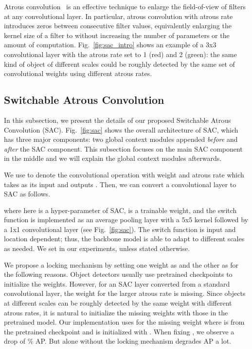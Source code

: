 \documentclass[final]{cvpr}
\begin{document}
Atrous convolution~\cite{holschneider1989real,papandreou2014untangling,chen2014semantic} is an effective technique to enlarge
the field-of-view of filters at any convolutional layer. In particular, atrous convolution with atrous rate  introduces  zeros between consecutive filter values, equivalently enlarging the kernel size of a  filter
to  without increasing the number of parameters or the amount of computation.
Fig.~\ref{fig:sac_intro} shows an example of a 3x3 convolutional layer with the atrous rate set to 1 (red) and 2 (green):
the same kind of object of different scales could be roughly detected by the same set of convolutional weights using different atrous rates.

\subsection{Switchable Atrous Convolution}

In this subsection, we present the details of our proposed Switchable Atrous Convolution (SAC).
Fig.~\ref{fig:sac} shows the overall architecture of SAC, which has three major components: two global context modules appended \textit{before} and \textit{after} the SAC component.
This subsection focuses on the main SAC component in the middle and we will explain the global context modules afterwards.

We use  to denote the convolutional operation with weight  and atrous rate  which takes  as its input and outputs .
Then, we can convert a convolutional layer to SAC as follows.

where  here is a hyper-parameter of SAC,  is a trainable weight, and the switch function  is implemented as an average pooling layer with a 5x5 kernel followed by a 1x1 convolutional layer (see Fig.~\ref{fig:sac}).
The switch function is input and location dependent; thus, the backbone model is able to adapt to different scales as needed.
We set  in our experiments, unless stated otherwise.

We propose a locking mechanism by setting one weight as  and the other as  for the following reasons.
Object detectors usually use pretrained checkpoints to initialize the weights.
However, for an SAC layer converted from a standard convolutional layer, the weight for the larger atrous rate is missing.
Since objects at different scales can be roughly detected by the same weight with different atrous rates, it is natural to initialize the missing weights with those in the pretrained model.
Our implementation uses  for the missing weight where  is from the pretrained checkpoint and   is initialized with .
When fixing , we observe a drop of \% AP.
But  alone without the locking mechanism degrades AP a lot.
\end{document}
